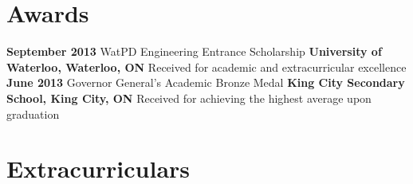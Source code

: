 \documentclass[hidelinks]{kkurucz-cv}
\begin{document}

\vspace{-5.5mm}
\section{Awards}

\begin{entrylist}
\entry
{\textbf{September 2013}}
{WatPD Engineering Entrance Scholarship}
{\textbf{University of Waterloo, Waterloo, ON}}
{Received for academic and extracurricular excellence}
{\null}
\entry
{\textbf{June 2013}}
{Governor General's Academic Bronze Medal}
{\textbf{King City Secondary School, King City, ON}}
{Received for achieving the highest average upon graduation}
{\null}
\end{entrylist}


\section{Extracurriculars}
\end{document}
